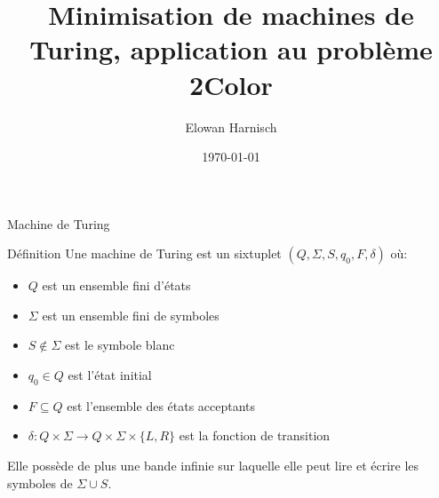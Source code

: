 \documentclass{beamer}
\title{Minimisation de machines de Turing, application au problème 2Color}
\date{\today}
\author{Elowan Harnisch}
\begin{document}
    \maketitle
    \begin{frame}{Machine de Turing}
        \begin{alert}{Définition}
            Une machine de Turing est un sixtuplet $(Q, \Sigma, S, q_0, F, \delta)$ où:
            \begin{itemize}
                \item $Q$ est un ensemble fini d'états
                \item $\Sigma$ est un ensemble fini de symboles
                \item $S \notin \Sigma$ est le symbole blanc
                \item $q_0 \in Q$ est l'état initial
                \item $F \subseteq Q$ est l'ensemble des états acceptants
                \item $\delta: Q \times \Sigma \rightarrow Q \times \Sigma \times \{L, R\}$ est la fonction de 
                transition
            \end{itemize}
            Elle possède de plus une bande infinie sur laquelle elle peut
            lire et écrire les symboles de $\Sigma \cup {S}$.
        \end{alert}
    \end{frame}
\end{document}
